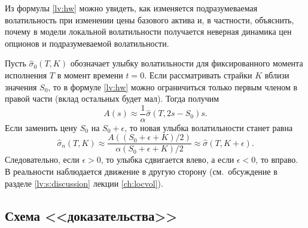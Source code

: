 \begin{remark}
Из формулы \eqref{lv:hw} можно увидеть, как изменяется подразумеваемая волатильность при изменении цены базового актива и, в частности, объяснить, почему в модели локальной волатильности получается неверная динамика цен опционов и подразумеваемой волатильности.

Пусть $\hat\sigma_0(T,K)$ обозначает улыбку волатильности для фиксированного момента исполнения $T$ в момент времени $t=0$.
Если рассматривать страйки $K$ вблизи значения $S_0$, то в формуле \eqref{lv:hw} можно ограничиться только первым членом в правой части (вклад остальных будет мал). 
Тогда получим
\[
A(s) \approx \frac{1}{\alpha} \hat\sigma(T, 2 s - S_0) s.
\]
Если заменить цену $S_0$ на $S_0+\epsilon$, то новая улыбка волатильности станет равна
\[
\hat\sigma_{n}(T, K) 
\approx \frac{A((S_0+ \epsilon + K)/2)}{\alpha (S_0+\epsilon+K)/2}
\approx \hat\sigma(T, K + \epsilon).
\]
Следовательно, если $\epsilon>0$, то улыбка сдвигается влево, а если $\epsilon<0$, то вправо.
В реальности наблюдается движение в другую сторону (см.~обсуждение в разделе \ref{lv:s:discussion} лекции \ref{ch:locvol}).
\end{remark}


\subsection{Схема <<доказательства>>}

